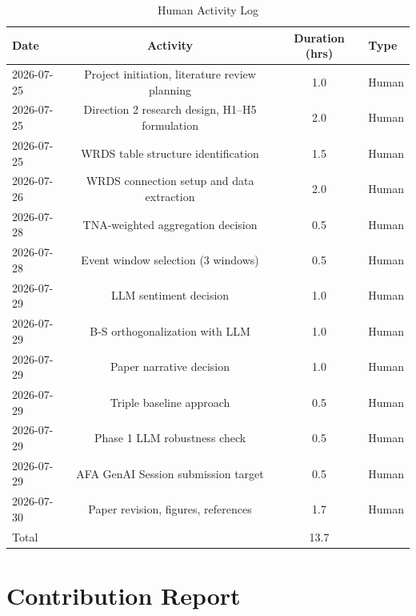 \documentclass[11pt,a4paper]{article}
\begin{document}
\begin{table}[H]
\centering
\caption{Human Activity Log}
\label{tab:human_log}
\begin{tabular}{lccl}
\toprule
Date & Activity & Duration (hrs) & Type \\
\midrule
2026-07-25 & Project initiation, literature review planning & 1.0 & Human \\
2026-07-25 & Direction 2 research design, H1--H5 formulation & 2.0 & Human \\
2026-07-25 & WRDS table structure identification & 1.5 & Human \\
2026-07-26 & WRDS connection setup and data extraction & 2.0 & Human \\
2026-07-28 & TNA-weighted aggregation decision & 0.5 & Human \\
2026-07-28 & Event window selection (3 windows) & 0.5 & Human \\
2026-07-29 & LLM sentiment decision & 1.0 & Human \\
2026-07-29 & B-S orthogonalization with LLM & 1.0 & Human \\
2026-07-29 & Paper narrative decision & 1.0 & Human \\
2026-07-29 & Triple baseline approach & 0.5 & Human \\
2026-07-29 & Phase 1 LLM robustness check & 0.5 & Human \\
2026-07-29 & AFA GenAI Session submission target & 0.5 & Human \\
2026-07-30 & Paper revision, figures, references & 1.7 & Human \\
\midrule
\multicolumn{2}{l}{Total} & 13.7 & \\
\bottomrule
\end{tabular}
\end{table}

\section{Contribution Report}
\label{app:contribution}
\end{document}
